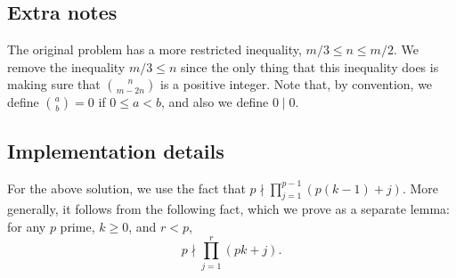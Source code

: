 \documentclass{article}
\begin{document}
\subsection*{Extra notes}

The original problem has a more restricted inequality, $m/3 \leq n \leq m/2$.
We remove the inequality $m/3 \leq n$ since the only thing that this inequality does is making sure that $\binom{n}{m - 2n}$ is a positive integer.
Note that, by convention, we define $\binom{a}{b} = 0$ if $0 \leq a < b$, and also we define $0 \mid 0$.



\subsection*{Implementation details}

For the above solution, we use the fact that $p \nmid \displaystyle \prod_{j = 1}^{p - 1} (p(k - 1) + j)$.
More generally, it follows from the following fact, which we prove as a separate lemma: for any $p$ prime, $k \geq 0$, and $r < p$,
\[ p \nmid \prod_{j = 1}^r (pk + j). \]
\end{document}
